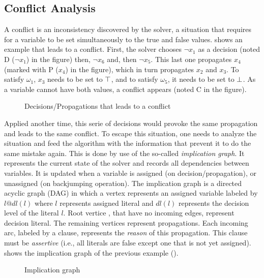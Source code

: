 

\subsection{Conflict Analysis}
A conflict is an inconsistency discovered by the solver, a situation that requires for a variable to be set 
simultaneously to the true and false values.  shows an example that leads to a conflict.
First, the solver chooses $\neg x_1$ as a decision (noted D ($\neg x_1$) in the figure) then, $\neg x_6$ and, then $\neg x_5$. This last one propagates $x_4$ (marked with P ($x_4$) in the figure),
which in turn propagates $x_2$ and $x_3$.
To satisfy $\omega_1$, $x_3$ needs to be set to $\top$, and  to satisfy $\omega_5$, 
it needs to be set to $\bot$. As a variable cannot have both values, a conflict appears (noted C in the figure).
\begin{figure}[!htbp]
 \centering
  
 \caption{Decisions/Propagations that leads to a  conflict}
 \label{fig:conflict}
\end{figure}

Applied another time, this serie of decisions would provoke the same propagation and leads to the same conflict. 
To escape this situation, one needs to analyze the situation and feed the algorithm with the information that prevent it to do the 
same mistake again. This is done by use of the so-called \emph{implication graph}.
It represents the current state of the solver and records all dependencies between  variables. It is updated when a variable is assigned 
(on decision/propagation), or unassigned (on backjumping operation). The implication graph is a directed acyclic graph (DAG) in which a vertex represents an assigned variable labeled by $l@dl(l)$ where $l$ represents assigned literal and $dl(l)$ represents the decision level of the literal $l$.
Root vertice , that have no incoming edges, represent decision literal. The remaining vertices represent
propagations.
Each incoming arc, labeled by a clause, represents the \emph{reason} of this propagation.
This clause must be \textit{assertive} (i.e., all  literals are false except one that is not yet assigned).
 shows the implication graph of the previous example ().

\begin{figure}[!htbp]
 \centering
 
 \caption{Implication graph}
 \label{fig:implication-graph}
\end{figure}


